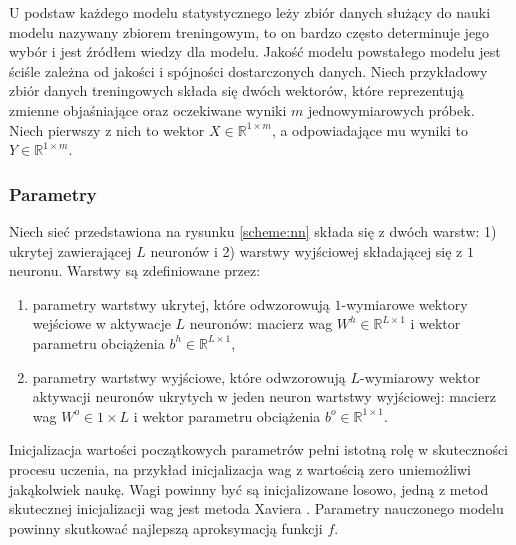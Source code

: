 \documentclass[11pt]{book}
\theoremstyle{definition}
\begin{document}
U podstaw każdego modelu statystycznego leży zbiór danych służący do nauki modelu nazywany zbiorem treningowym, to on bardzo często determinuje jego wybór i jest źródłem wiedzy dla modelu. Jakość modelu powstałego modelu jest ściśle zależna od jakości i spójności dostarczonych danych. Niech przykładowy zbiór danych treningowych składa się dwóch wektorów, które reprezentują zmienne objaśniające oraz oczekiwane wyniki $m$ jednowymiarowych próbek. Niech pierwszy z nich to wektor $X \in \mathbb{R}^{1\times m}$, a odpowiadające mu wyniki to $Y\in \mathbb{R}^{1\times m}$.


\subsubsection{Parametry}

Niech sieć przedstawiona na rysunku \ref{scheme:nn} składa się z dwóch warstw: 1) ukrytej zawierającej $L$ neuronów i 2) warstwy wyjściowej składającej się z $1$ neuronu. Warstwy są zdefiniowane przez:

\begin{enumerate}
	\item parametry wartstwy ukrytej, które odwzorowują $1$-wymiarowe wektory wejściowe w aktywacje $L$ neuronów:
	macierz wag $W^h\in\mathbb{R}^{L\times 1	}$ i wektor parametru obciążenia $b^h\in\mathbb{R}^{L\times 1}$,
	\item parametry wartstwy wyjściowe, które odwzorowują $L$-wymiarowy wektor aktywacji neuronów ukrytych w jeden neuron wartstwy wyjściowej:
macierz wag $W^o\in{1\times L}$ i wektor parametru obciążenia $b^o\in\mathbb{R}^{1\times 1}$.	
\end{enumerate}

Inicjalizacja wartości początkowych parametrów pełni istotną rolę w skuteczności procesu uczenia, na przykład inicjalizacja wag z wartością zero uniemożliwi jakąkolwiek naukę. Wagi powinny być są inicjalizowane losowo, jedną z metod skutecznej inicjalizacji wag jest metoda Xaviera \cite{Glorot10understandingthe}. Parametry nauczonego modelu powinny skutkować najlepszą aproksymacją funkcji $f$.
\end{document}
